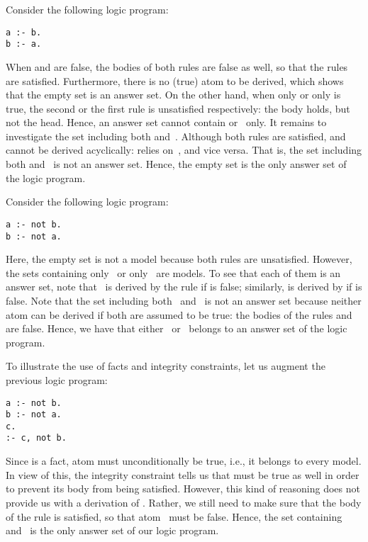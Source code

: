 \begin{example}\label{ex:as:one}
Consider the following logic program:
%
\begin{lstlisting}[numbers=none]
a :- b.
b :- a.
\end{lstlisting}
%
When  and  are false, the bodies of both rules are false as well,
so that the rules are satisfied.
Furthermore, there is no (true) atom to be derived,
which shows that the empty set is an answer set.
On the other hand, %
when only  or only  is true,
the second or the first rule is unsatisfied respectively:
the body holds, but not the head.
Hence, an answer set cannot contain  or~ only.
It remains to investigate the set including both  and~.
Although both rules are satisfied, %
 and~ cannot be derived acyclically:
 relies on~, and vice versa.
That is, the set including both  and~ is not an answer set. %
Hence, the empty set is the only answer set of the logic program.
\eexample
\end{example}

Consider the following logic program:
%
\begin{lstlisting}[numbers=none]
a :- not b.
b :- not a.
\end{lstlisting}
%
Here, the empty set is not a model because both rules are unsatisfied.
However, the sets containing only~ or only~ are models.
To see that each of them is an answer set,
note that~ is derived by the rule 
if  is false;
similarly,
 is derived by 
if  is false.
Note that the set including both~ and~ is not an answer set
because neither atom can be derived if both are assumed to be true:
the bodies of the rules
 and
 are false.
Hence, we have that
either~ or~ belongs to
an answer set of the logic program.

To illustrate the use of facts and integrity constraints,
let us augment the previous logic program:
\begin{lstlisting}[numbers=none]
a :- not b.
b :- not a.
c.
:- c, not b.
\end{lstlisting}
Since  is a fact,
atom  must unconditionally be true, i.e.,
it belongs to every model.
In view of this,
the integrity constraint
tells us that  must be true as well
in order to prevent its body from being satisfied.
However, this kind of reasoning does not provide us with
a derivation of .
Rather, we still need to make sure that the body
of the rule  is satisfied,
so that atom~ must be false.
Hence, the set containing  and~
is the only answer set of our logic program.

